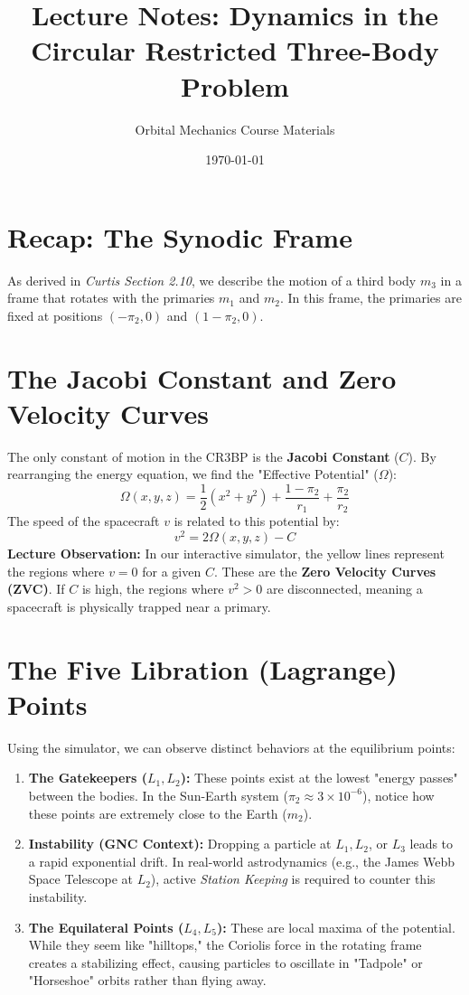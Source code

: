 \documentclass[11pt, a4paper]{article}
\title{Lecture Notes: Dynamics in the Circular Restricted Three-Body Problem}
\author{Orbital Mechanics Course Materials}
\date{\today}
\begin{document}
\maketitle

\section{Recap: The Synodic Frame}
As derived in \textit{Curtis Section 2.10}, we describe the motion of a third body $m_3$ in a frame that rotates with the primaries $m_1$ and $m_2$. In this frame, the primaries are fixed at positions $(-\pi_2, 0)$ and $(1-\pi_2, 0)$. 

\section{The Jacobi Constant and Zero Velocity Curves}
The only constant of motion in the CR3BP is the \textbf{Jacobi Constant} ($C$). By rearranging the energy equation, we find the "Effective Potential" ($\Omega$):
\begin{equation}
    \Omega(x, y, z) = \frac{1}{2}(x^2 + y^2) + \frac{1-\pi_2}{r_1} + \frac{\pi_2}{r_2}
\end{equation}
The speed of the spacecraft $v$ is related to this potential by:
\begin{equation}
    v^2 = 2\Omega(x, y, z) - C
\end{equation}
\textbf{Lecture Observation:} In our interactive simulator, the yellow lines represent the regions where $v=0$ for a given $C$. These are the \textbf{Zero Velocity Curves (ZVC)}. If $C$ is high, the regions where $v^2 > 0$ are disconnected, meaning a spacecraft is physically trapped near a primary.

\section{The Five Libration (Lagrange) Points}
Using the simulator, we can observe distinct behaviors at the equilibrium points:

\begin{enumerate}
    \item \textbf{The Gatekeepers ($L_1, L_2$):} These points exist at the lowest "energy passes" between the bodies. In the Sun-Earth system ($\pi_2 \approx 3 \times 10^{-6}$), notice how these points are extremely close to the Earth ($m_2$). 
    \item \textbf{Instability (GNC Context):} Dropping a particle at $L_1, L_2$, or $L_3$ leads to a rapid exponential drift. In real-world astrodynamics (e.g., the James Webb Space Telescope at $L_2$), active \textit{Station Keeping} is required to counter this instability.
    \item \textbf{The Equilateral Points ($L_4, L_5$):} These are local maxima of the potential. While they seem like "hilltops," the Coriolis force in the rotating frame creates a stabilizing effect, causing particles to oscillate in "Tadpole" or "Horseshoe" orbits rather than flying away.
\end{enumerate}
\end{document}
